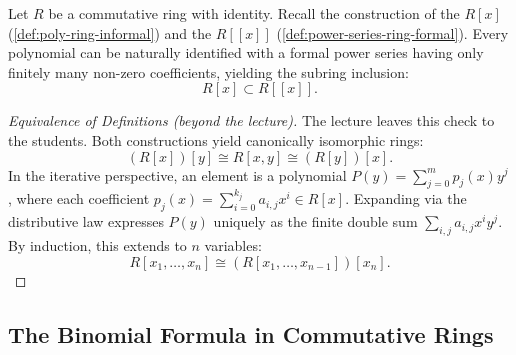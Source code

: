 \begin{content}
Let $R$ be a commutative ring with identity. Recall the construction of the  $R[x]$ (\cref{def:poly-ring-informal}) and the  $R[[x]]$ (\cref{def:power-series-ring-formal}). Every polynomial can be naturally identified with a formal power series having only finitely many non-zero coefficients, yielding the subring inclusion:
\[
R[x] \subset R[[x]].
\]


\begin{proof}[Equivalence of Definitions (beyond the lecture)]
The lecture leaves this check to the students. Both constructions yield canonically isomorphic rings:
\[
(R[x])[y] \cong R[x, y] \cong (R[y])[x].
\]
In the iterative perspective, an element is a polynomial $P(y) = \sum_{j=0}^m p_j(x) y^j$, where each coefficient $p_j(x) = \sum_{i=0}^{k_j} a_{i,j} x^i \in R[x]$. Expanding via the distributive law expresses $P(y)$ uniquely as the finite double sum $\sum_{i, j} a_{i,j} x^i y^j$. By induction, this extends to $n$ variables:
\[
R[x_1, \dots, x_n] \cong (R[x_1, \dots, x_{n-1}])[x_n].
\]
\end{proof}
\end{content}

\subsection{The Binomial Formula in Commutative Rings}

